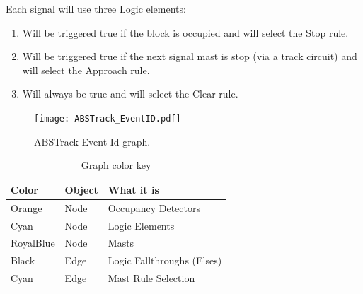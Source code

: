 Each signal will use three Logic elements:

\begin{enumerate}
\item Will be triggered true if the block is occupied and will select the Stop 
rule.
\item Will be triggered true if the next signal mast is stop (via a track 
circuit) and will select the Approach rule.
\item Will always be true and will select the Clear rule.
\end{enumerate}

\begin{figure}[hbpt]\begin{centering}%
\texttt{[image: ABSTrack\_EventID.pdf]}
\caption{ABSTrack Event Id graph.}
\label{fig:ABSTrackEventID}
\end{centering}\end{figure}
\begin{table}[hbpt]\begin{centering}%
\begin{tabular}{|l|l|p{2in}|}
\hline
Color&Object&What it is\\
\hline
Orange&Node&Occupancy Detectors\\
\hline
Cyan&Node&Logic Elements\\
\hline
RoyalBlue&Node&Masts\\
\hline 
Black&Edge&Logic Fallthroughs (Elses)\\
\hline
Cyan&Edge&Mast Rule Selection\\
\hline
\end{tabular}
\caption{Graph color key}
\label{tab:ExampleSidingCP1EventFlow}
\end{centering}\end{table}
                                        
